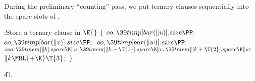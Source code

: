 During the preliminary ``counting'' pass,
we put ternary clauses sequentially into the spare slots of .

\Y\B\4:Store a ternary clause in \X${}\E{}$\6
${}\{{}$\1\6
${}\\{oo},\39\\{timp}[\\{bar}(\|u)].\\{size}\PP;{}$\6
${}\\{oo},\39\\{timp}[\\{bar}(\|v)].\\{size}\PP;{}$\6
${}\\{oo},\39\\{timp}[\\{bar}(\|w)].\\{size}\PP;{}$\6
${}\\{ooo},\39\\{tmem}[\|k].\\{spare}\K\|u,\39\\{tmem}[\|k+\T{1}].\\{spare}\K%
\|v,\39\\{tmem}[\|k+\T{2}].\\{spare}\K\|w;{}$\6
${}\|k\MRL{+{\K}}\T{3};{}$\6
\4${}\}{}$\2\par
\U41.\fi

